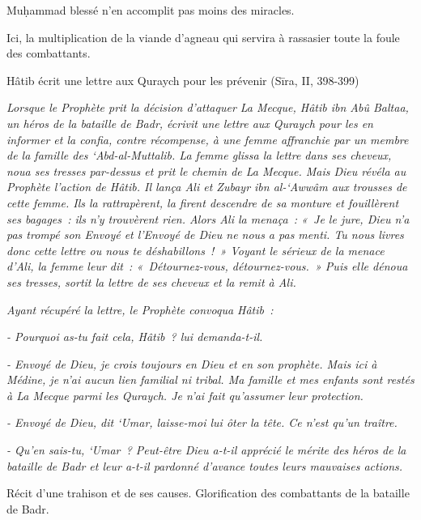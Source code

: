 Muḥammad blessé n'en accomplit pas moins des miracles.

Ici, la multiplication de la viande d'agneau qui servira à rassasier
toute la foule des combattants.


Hâtib écrit une lettre aux Quraych pour les prévenir (Sīra, II, 398-399)

\emph{Lorsque le Prophète prit la décision d'attaquer La Mecque, Hâtib
ibn Abû Baltaa, un héros de la bataille de Badr, écrivit une
lettre aux Quraych pour les en informer et la confia, contre récompense,
à une femme affranchie par un membre de la famille des `Abd-al-Muttalib.
La femme glissa la lettre dans ses cheveux, noua ses tresses par-dessus
et prit le chemin de La Mecque. Mais Dieu révéla au Prophète l'action de
Hâtib. Il lança Ali et Zubayr ibn al-`Awwâm aux trousses de cette femme.
Ils la rattrapèrent, la firent descendre de sa monture et fouillèrent
ses bagages~: ils n'y trouvèrent rien. Alors Ali la menaça~: «~Je le
jure, Dieu n'a pas trompé son Envoyé et l'Envoyé de Dieu ne nous a pas
menti. Tu nous livres donc cette lettre ou nous te déshabillons~!~»
Voyant le sérieux de la menace d'Ali, la femme leur dit~:
«~Détournez-vous, détournez-vous.~» Puis elle dénoua ses tresses, sortit
la lettre de ses cheveux et la remit à Ali.}

\emph{Ayant récupéré la lettre, le Prophète convoqua Hâtib~:}

\emph{- Pourquoi as-tu fait cela, Hâtib~? lui demanda-t-il.}

\emph{- Envoyé de Dieu, je crois toujours en Dieu et en son prophète.
Mais ici à Médine, je n'ai aucun lien familial ni tribal. Ma famille et
mes enfants sont restés à La Mecque parmi les Quraych. Je n'ai fait
qu'assumer leur protection.}

\emph{- Envoyé de Dieu, dit `Umar, laisse-moi lui ôter la tête. Ce n'est
qu'un traître.}

\emph{- Qu'en sais-tu, `Umar~? Peut-être Dieu a-t-il apprécié le mérite
des héros de la bataille de Badr et leur a-t-il pardonné d'avance toutes
leurs mauvaises actions.}

Récit d'une trahison et de ses causes. Glorification des combattants de
la bataille de Badr.

